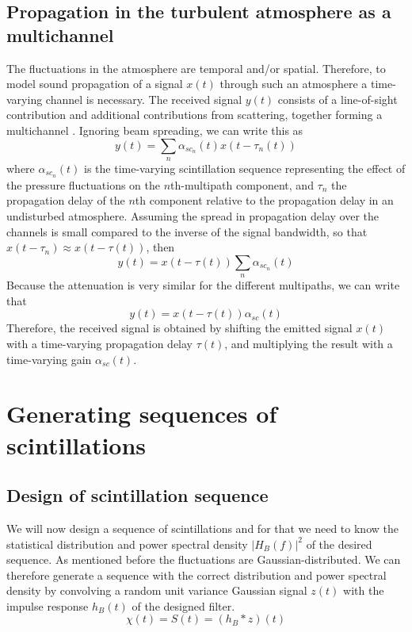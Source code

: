 \subsection{Propagation in the turbulent atmosphere as a multichannel}
The fluctuations in the atmosphere are temporal and/or spatial. Therefore, to
model sound propagation of a signal $x(t)$ through such an atmosphere a
time-varying channel is necessary. The received signal $y(t)$ consists of a
line-of-sight contribution and additional contributions from scattering,
together forming a multichannel \cite{Jurado-navas2006}.
Ignoring beam spreading, we can write this as %
\begin{equation}
 y(t) = \sum_{n} \alpha_{sc_{n}}(t) x(t-\tau_n(t))
\end{equation}
where $\alpha_{sc_{n}}(t)$ is the time-varying scintillation sequence
representing the effect of the pressure fluctuations on the $n$th-multipath
component, and $\tau_n$ the propagation delay of the $n$th component relative to the propagation delay in an undisturbed atmosphere.
Assuming the spread in propagation delay over the channels is small compared to the inverse of the signal bandwidth, so that $x(t-\tau_n) \approx x(t - \tau(t))$, then
\begin{equation}
 y(t) = x(t - \tau(t)) \sum_n \alpha_{sc_{n}}(t)
\end{equation}
Because the attenuation is very similar for the different multipaths, we can write that
\begin{equation}\label{eq:generating_sequences_multiplicative}
 y(t) = x(t - \tau(t)) \alpha_{sc}(t)
\end{equation}
Therefore, the received signal is obtained by shifting the emitted signal $x(t)$ with a time-varying propagation delay $\tau(t)$, and multiplying the result with a time-varying gain $\alpha_{sc}(t)$.

\section{Generating sequences of scintillations}

\subsection{Design of scintillation sequence}
We will now design a sequence of scintillations and for that we need to know the
statistical distribution and power spectral density $|H_B(f)|^2$ of the desired
sequence. As mentioned before the fluctuations are Gaussian-distributed. We can
therefore generate a sequence with the correct distribution and power spectral
density by convolving a random unit variance Gaussian signal $z(t)$ with the
impulse response $h_B(t)$ of the designed filter.
\begin{equation}
 \chi(t) = S(t) = (h_B \ast z)(t)
\end{equation}

